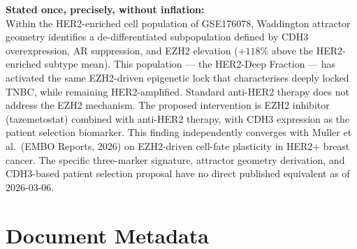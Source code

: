 \documentclass[12pt, a4paper]{article}
\begin{document}
\begin{center}
\colorbox{findingbox}{
\begin{minipage}{0.88\textwidth}
\vspace{0.6em}
\textbf{Stated once, precisely, without
inflation:}\\[0.5em]
Within the HER2-enriched cell population
of GSE176078, Waddington attractor geometry
identifies a de-differentiated subpopulation
defined by CDH3 overexpression, AR suppression,
and EZH2 elevation ($+118\%$ above the
HER2-enriched subtype mean). This population
--- the HER2-Deep Fraction --- has activated
the same EZH2-driven epigenetic lock that
characterises deeply locked TNBC, while
remaining HER2-amplified. Standard anti-HER2
therapy does not address the EZH2 mechanism.
The proposed intervention is EZH2 inhibitor
(tazemetostat) combined with anti-HER2 therapy,
with CDH3 expression as the patient selection
biomarker. This finding independently
converges with Muller et al.\ (EMBO Reports,
2026) on EZH2-driven cell-fate plasticity
in HER2+ breast cancer. The specific
three-marker signature, attractor geometry
derivation, and CDH3-based patient selection
proposal have no direct published equivalent
as of 2026-03-06.
\vspace{0.5em}
\end{minipage}}
\end{center}

\section{Document Metadata}
\end{document}
